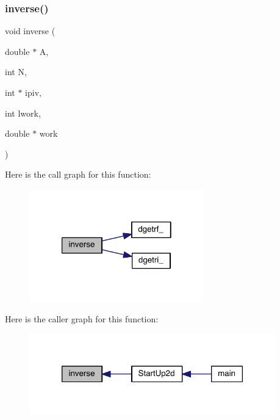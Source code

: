 \subsubsection{\texorpdfstring{inverse()}{inverse()}}
{\footnotesize\ttfamily void inverse (\begin{DoxyParamCaption}\item[{double $\ast$}]{A,  }\item[{int}]{N,  }\item[{int $\ast$}]{ipiv,  }\item[{int}]{lwork,  }\item[{double $\ast$}]{work }\end{DoxyParamCaption})}

Here is the call graph for this function\+:\nopagebreak
\begin{figure}[H]
\begin{center}
\leavevmode
\includegraphics[width=214pt]{a00596_ad2387c52fae7bf66e1511ef9a281ee26_cgraph}
\end{center}
\end{figure}
Here is the caller graph for this function\+:\nopagebreak
\begin{figure}[H]
\begin{center}
\leavevmode
\includegraphics[width=302pt]{a00596_ad2387c52fae7bf66e1511ef9a281ee26_icgraph}
\end{center}
\end{figure}
\mbox{\label{a00596_a35ba318a20f8b83eefe63eeb1e1ac4b0}} 
